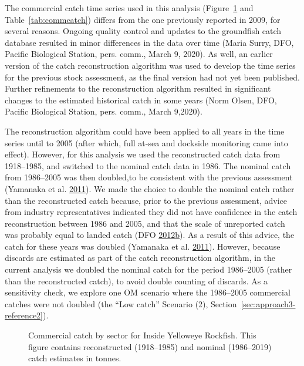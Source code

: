 \documentclass[11pt]{book}
\begin{document}
The commercial catch time series used in this analysis (Figure~\ref{fig:commcatch2} and Table~\ref{tab:commcatch}) differs from the one previously reported in 2009, for several reasons. Ongoing quality control and updates to the groundfish catch database resulted in minor differences in the data over time (Maria Surry, DFO, Pacific Biological Station, pers. comm., March 9, 2020). As well, an earlier version of the catch reconstruction algorithm was used to develop the time series for the previous stock assessment, as the final version had not yet been published. Further refinements to the reconstruction algorithm resulted in significant changes to the estimated historical catch in some years (Norm Olsen, DFO, Pacific Biological Station, pers. comm., March 9,2020).

The reconstruction algorithm could have been applied to all years in the time series until to 2005 (after which, full at-sea and dockside monitoring came into effect). However, for this analysis we used the reconstructed catch data from 1918--1985, and switched to the nominal catch data in 1986. The nominal catch from 1986--2005 was then doubled,to be consistent with the previous assessment (Yamanaka et al. \protect\hyperlink{ref-yamanaka2011}{2011}). We made the choice to double the nominal catch rather than the reconstructed catch because, prior to the previous assessment, advice from industry representatives indicated they did not have confidence in the catch reconstruction between 1986 and 2005, and that the scale of unreported catch was probably equal to landed catch (DFO \protect\hyperlink{ref-dfo2012b}{2012}\protect\hyperlink{ref-dfo2012b}{b}). As a result of this advice, the catch for these years was doubled (Yamanaka et al. \protect\hyperlink{ref-yamanaka2011}{2011}). However, because discards are estimated as part of the catch reconstruction algorithm, in the current analysis we doubled the nominal catch for the period 1986--2005 (rather than the reconstructed catch), to avoid double counting of discards. As a sensitivity check, we explore one OM scenario where the 1986--2005 commercial catches were not doubled (the ``Low catch'' Scenario (2), Section~\ref{sec:approach3-reference2}).
\begin{figure}[htb]

{\centering {} 

}

\caption{Commercial catch by sector for Inside Yelloweye Rockfish. This figure contains reconstructed (1918--1985) and nominal (1986--2019) catch estimates in tonnes.}\label{fig:commcatch2}
\end{figure}
\end{document}
